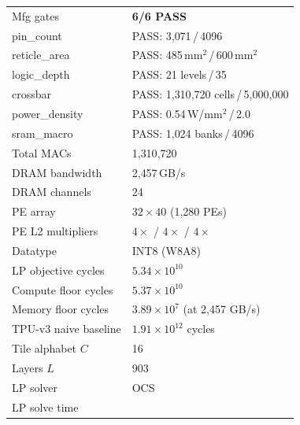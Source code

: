 \begin{table}[h]
\begin{tabular}{@{}ll@{}}
\midrule
Mfg gates               & \textcolor{green!60!black}{\textbf{6/6 PASS}} \\
\quad pin\_count         & PASS: 3{,}071\,/\,4096 \\
\quad reticle\_area      & PASS: 485\,mm$^2$\,/\,600\,mm$^2$ \\
\quad logic\_depth       & PASS: 21 levels\,/\,35 \\
\quad crossbar           & PASS: 1{,}310{,}720 cells\,/\,5{,}000{,}000 \\
\quad power\_density     & PASS: 0.54\,W/mm$^2$\,/\,2.0 \\
\quad sram\_macro        & PASS: 1{,}024 banks\,/\,4096 \\
\midrule
Total MACs              & 1{,}310{,}720 \\
DRAM bandwidth          & 2{,}457\,GB/s \\
DRAM channels           & 24 \\
PE array                & $32 \times 40$ (1{,}280 PEs) \\
PE L2 multipliers       & $4\times$ / $4\times$ / $4\times$ \\
Datatype                & INT8 (W8A8) \\
LP objective cycles     & $5.34 \times 10^{10}$ \\
Compute floor cycles    & $5.37 \times 10^{10}$ \\
Memory floor cycles     & $3.89 \times 10^{7}$ (at 2{,}457 GB/s) \\
TPU-v3 naive baseline   & $1.91 \times 10^{12}$ cycles \\
Tile alphabet $C$       & 16 \\
Layers $L$              & 903 \\
LP solver               & OCS \\
LP solve time           &  \\
\bottomrule
\end{tabular}
\end{table}


